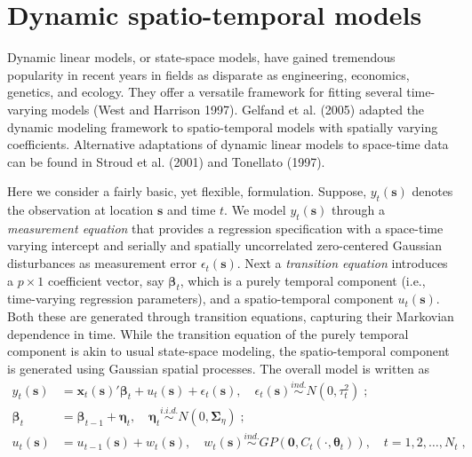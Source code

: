 \documentclass{article}
\newcommand{\bs}{ {\boldsymbol s} }
\newcommand{\bx}{ {\boldsymbol x} }
\newcommand{\bbeta}{ {\boldsymbol \beta} }
\newcommand{\bet}{ {\boldsymbol \eta} }
\newcommand{\bSigma}{ {\boldsymbol \Sigma} }
\newcommand{\btheta}{ {\boldsymbol \theta} }
\newcommand{\bzero}{ {\boldsymbol 0} }
\begin{document}
\section{Dynamic spatio-temporal models}\label{models}
Dynamic linear models, or state-space models, have gained tremendous
popularity in recent years in fields as disparate as engineering, economics, genetics, and ecology. They offer a versatile framework for fitting several time-varying models (West and Harrison 1997).  Gelfand et al. (2005) adapted the dynamic modeling framework to spatio-temporal models with spatially varying coefficients. Alternative adaptations of dynamic linear models to space-time data can be found in Stroud et al. (2001) and Tonellato (1997). 

Here we consider a fairly basic, yet flexible, formulation. Suppose, $y_t(\bs)$ denotes the observation at location $\bs$ and time
$t$. We model $y_t(\bs)$ through a \emph{measurement equation} that
provides a regression specification with a space-time varying
intercept and  serially and spatially
uncorrelated zero-centered Gaussian disturbances as measurement error
$\epsilon_t(\bs)$. Next a \emph{transition equation} introduces a $p
\times 1$ coefficient vector, say $\bbeta_t$, which is a purely
temporal component (i.e., time-varying regression parameters), and a
spatio-temporal component $u_t(\bs)$. Both these are generated through
transition equations, capturing their Markovian dependence in
time. While the transition equation of the purely temporal component
is akin to usual state-space modeling, the spatio-temporal component is
generated using Gaussian spatial processes. The overall model is written as
\begin{align}\label{Eq: Dynamic_ST_Model}
y_t(\bs) & = \bx_t(\bs)'\bbeta_t + u_t(\bs) + \epsilon_t(\bs),\quad \epsilon_t(\bs)\stackrel{ind.}\sim N(0,\tau_{t}^2)\; ;\nonumber \\
\bbeta_t & = \bbeta_{t-1} + \bet_t,\quad \bet_t\stackrel{i.i.d.}\sim
N(0,\bSigma_{\eta})\; ;\nonumber \\
u_t(\bs) &= u_{t-1}(\bs) + w_t(\bs),\quad w_t(\bs) \stackrel{ind.}{\sim} GP\left(\bzero, C_t(\cdot,\btheta_t)\right),\quad t=1,2,\ldots,N_t\;,
\end{align}
\end{document}
